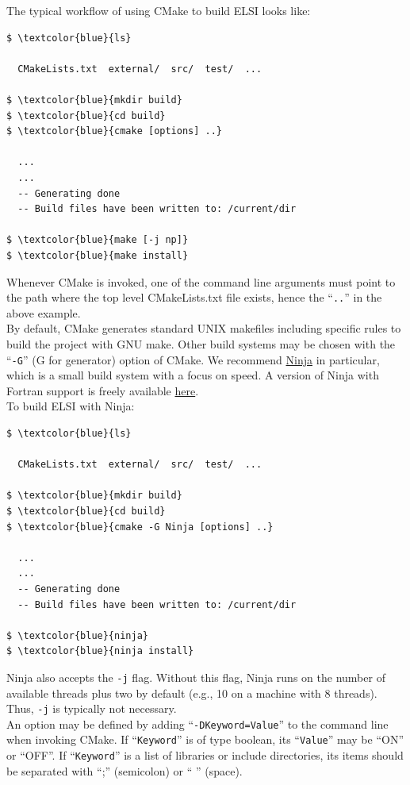 \documentclass{report}
\begin{document}
The typical workflow of using CMake to build ELSI looks like:
\begin{Verbatim}[commandchars=\\\{\}]
$ \textcolor{blue}{ls}

  CMakeLists.txt  external/  src/  test/  ...

$ \textcolor{blue}{mkdir build}
$ \textcolor{blue}{cd build}
$ \textcolor{blue}{cmake [options] ..}

  ...
  ...
  -- Generating done
  -- Build files have been written to: /current/dir

$ \textcolor{blue}{make [-j np]}
$ \textcolor{blue}{make install}
\end{Verbatim}

\bigskip
Whenever CMake is invoked, one of the command line arguments must point to the path where the top level CMakeLists.txt file exists, hence the ``\verb+..+'' in the above example.\\

By default, CMake generates standard UNIX makefiles including specific rules to build the project with GNU make.  Other build systems may be chosen with the ``\verb+-G+'' (G for generator) option of CMake.  We recommend \href{http://ninja-build.org}{Ninja} in particular, which is a small build system with a focus on speed.  A version of Ninja with Fortran support is freely available \href{http://github.com/Kitware/ninja}{here}.\\

To build ELSI with Ninja:
\begin{Verbatim}[commandchars=\\\{\}]
$ \textcolor{blue}{ls}

  CMakeLists.txt  external/  src/  test/  ...

$ \textcolor{blue}{mkdir build}
$ \textcolor{blue}{cd build}
$ \textcolor{blue}{cmake -G Ninja [options] ..}

  ...
  ...
  -- Generating done
  -- Build files have been written to: /current/dir

$ \textcolor{blue}{ninja}
$ \textcolor{blue}{ninja install}
\end{Verbatim}

\bigskip
Ninja also accepts the \verb+-j+ flag.  Without this flag, Ninja runs on the number of available threads plus two by default (e.g., 10 on a machine with 8 threads).  Thus, \verb+-j+ is typically not necessary.\\

An option may be defined by adding ``\verb+-DKeyword=Value+'' to the command line when invoking CMake.  If ``\verb+Keyword+'' is of type boolean, its ``\verb+Value+'' may be ``ON'' or ``OFF''.  If ``\verb+Keyword+'' is a list of libraries or include directories, its items should be separated with ``;'' (semicolon) or `` '' (space).\\
\end{document}
